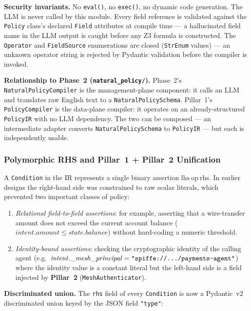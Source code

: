 \documentclass[12pt,a4paper,oneside]{report}
\newcommand{\fname}[1]{\texttt{#1}}          %
\newcommand{\code}[1]{\texttt{#1}}           %
\begin{document}
\textbf{Security invariants.}  No \code{eval()}, no \code{exec()}, no
dynamic code generation.  The LLM is never called by this module.  Every
field reference is validated against the \code{Policy} class's declared
\code{Field} attributes at compile time --- a hallucinated field name in the
LLM output is caught before any Z3 formula is constructed.  The \code{Operator}
and \code{FieldSource} enumerations are closed (\code{StrEnum} values) ---
an unknown operator string is rejected by Pydantic validation before the
compiler is invoked.

\textbf{Relationship to Phase~2 (\fname{natural\_policy/}).}  Phase~2's
\code{NaturalPolicyCompiler} is the management-plane component: it calls an
LLM and translates raw English text to a \code{NaturalPolicySchema}.
Pillar~1's \code{PolicyCompiler} is the data-plane compiler: it operates on
an already-structured \code{PolicyIR} with no LLM dependency.  The two can
be composed --- an intermediate adapter converts \code{NaturalPolicySchema}
to \code{PolicyIR} --- but each is independently usable.

\subsubsection{Polymorphic RHS and Pillar~1 + Pillar~2 Unification}

A \code{Condition} in the IR represents a single binary assertion
$\mathrm{lhs}\ \mathrm{op}\ \mathrm{rhs}$.  In earlier designs the
right-hand side was constrained to raw scalar literals, which prevented two
important classes of policy:

\begin{enumerate}
  \item \emph{Relational field-to-field assertions}: for example, asserting
    that a wire-transfer amount does not exceed the current account balance
    (\(\mathit{intent.amount} \leq \mathit{state.balance}\)) without
    hard-coding a numeric threshold.
  \item \emph{Identity-bound assertions}: checking the cryptographic identity
    of the calling agent (e.g.\
    $\mathit{intent.\_mesh\_principal} = \texttt{"spiffe://\dots/payments-agent"}$)
    where the identity value is a constant literal but the left-hand side
    is a field injected by \textbf{Pillar~2} (\code{MeshAuthenticator}).
\end{enumerate}

\textbf{Discriminated union.}  The \code{rhs} field of every \code{Condition}
is now a Pydantic~v2 discriminated union keyed by the JSON field \code{"type"}:
\end{document}
